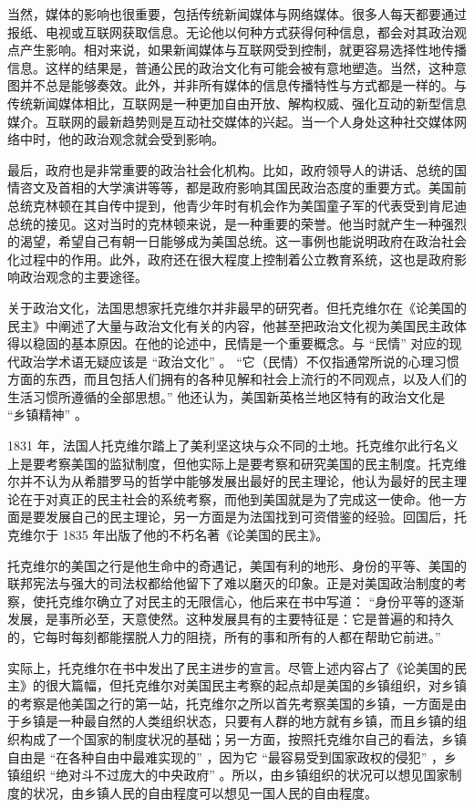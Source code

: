 当然，媒体的影响也很重要，包括传统新闻媒体与网络媒体。很多人每天都要通过报纸、电视或互联网获取信息。无论他以何种方式获得何种信息，都会对其政治观点产生影响。相对来说，如果新闻媒体与互联网受到控制，就更容易选择性地传播信息。这样的结果是，普通公民的政治文化有可能会被有意地塑造。当然，这种意图并不总是能够奏效。此外，并非所有媒体的信息传播特性与方式都是一样的。与传统新闻媒体相比，互联网是一种更加自由开放、解构权威、强化互动的新型信息媒介。互联网的最新趋势则是互动社交媒体的兴起。当一个人身处这种社交媒体网络中时，他的政治观念就会受到影响。

最后，政府也是非常重要的政治社会化机构。比如，政府领导人的讲话、总统的国情咨文及首相的大学演讲等等，都是政府影响其国民政治态度的重要方式。美国前总统克林顿在其自传中提到，他青少年时有机会作为美国童子军的代表受到肯尼迪总统的接见。这对当时的克林顿来说，是一种重要的荣誉。他当时就产生一种强烈的渴望，希望自己有朝一日能够成为美国总统。这一事例也能说明政府在政治社会化过程中的作用。此外，政府还在很大程度上控制着公立教育系统，这也是政府影响政治观念的主要途径。


关于政治文化，法国思想家托克维尔并非最早的研究者。但托克维尔在《论美国的民主》中阐述了大量与政治文化有关的内容，他甚至把政治文化视为美国民主政体得以稳固的基本原因。在他的论述中，民情是一个重要概念。与 “民情” 对应的现代政治学术语无疑应该是 “政治文化” 。 “它（民情）不仅指通常所说的心理习惯方面的东西，而且包括人们拥有的各种见解和社会上流行的不同观点，以及人们的生活习惯所遵循的全部思想。” 他还认为，美国新英格兰地区特有的政治文化是 “乡镇精神” 。

1831 年，法国人托克维尔踏上了美利坚这块与众不同的土地。托克维尔此行名义上是要考察美国的监狱制度，但他实际上是要考察和研究美国的民主制度。托克维尔并不认为从希腊罗马的哲学中能够发展出最好的民主理论，他认为最好的民主理论在于对真正的民主社会的系统考察，而他到美国就是为了完成这一使命。他一方面是要发展自己的民主理论，另一方面是为法国找到可资借鉴的经验。回国后，托克维尔于 1835 年出版了他的不朽名著《论美国的民主》。

托克维尔的美国之行是他生命中的奇遇记，美国有利的地形、身份的平等、美国的联邦宪法与强大的司法权都给他留下了难以磨灭的印象。正是对美国政治制度的考察，使托克维尔确立了对民主的无限信心，他后来在书中写道： “身份平等的逐渐发展，是事所必至，天意使然。这种发展具有的主要特征是：它是普遍的和持久的，它每时每刻都能摆脱人力的阻挠，所有的事和所有的人都在帮助它前进。” 

实际上，托克维尔在书中发出了民主进步的宣言。尽管上述内容占了《论美国的民主》的很大篇幅，但托克维尔对美国民主考察的起点却是美国的乡镇组织，对乡镇的考察是他美国之行的第一站，托克维尔之所以首先考察美国的乡镇，一方面是由于乡镇是一种最自然的人类组织状态，只要有人群的地方就有乡镇，而且乡镇的组织构成了一个国家的制度状况的基础；另一方面，按照托克维尔自己的看法，乡镇自由是 “在各种自由中最难实现的” ，因为它 “最容易受到国家政权的侵犯” ，乡镇组织 “绝对斗不过庞大的中央政府” 。所以，由乡镇组织的状况可以想见国家制度的状况，由乡镇人民的自由程度可以想见一国人民的自由程度。

